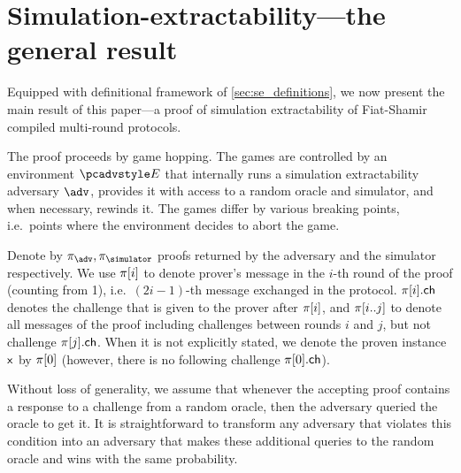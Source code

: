 \section{Simulation-extractability---the general result}
\label{sec:general}
Equipped with definitional framework of \cref{sec:se_definitions}, we now present the main result of this paper---a proof of
simulation extractability of Fiat-Shamir compiled multi-round protocols.

The proof proceeds by game hopping. The games are controlled by an environment $\env$
that internally runs a simulation extractability adversary $\advse$, provides it
with access to a random oracle and simulator, and when necessary, rewinds it. The
games differ by various breaking points, i.e.~points where the environment
decides to abort the game.

Denote by $\zkproof_{\advse}, \zkproof_{\simulator}$ proofs returned by the
adversary and the simulator respectively. We use $\pi[i]$ to denote
prover's message in the $i$-th round of the proof (counting from 1),
i.e.~$(2i - 1)$-th message exchanged in the protocol. $\pi[i].\mathsf{ch}$ denotes
the challenge that is given to the prover after $\pi[i]$, and
$\pi[i..j]$ to denote all messages of the proof including challenges
between rounds $i$ and $j$, but not challenge $\pi[j].\mathsf{ch}$. When it is not
explicitly stated, we denote the proven instance $\mathsf{x}$ by $\pi[0]$
(however, there is no following challenge $\pi[0].\mathsf{ch}$).

Without loss of generality, we assume that whenever the accepting proof contains
a response to a challenge from a random oracle, then the adversary queried the
oracle to get it. It is straightforward to transform any adversary that violates
this condition into an adversary that makes these additional queries to the
random oracle and wins with the same probability.


